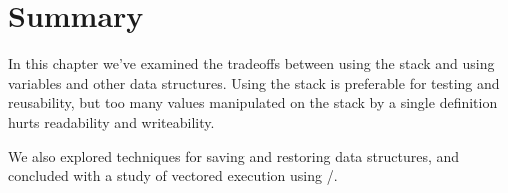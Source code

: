 \section{Summary}
In this chapter we've examined the tradeoffs between using the stack and
using variables and other data structures. Using the stack is preferable
for testing and reusability, but too many values manipulated on the stack
by a single definition hurts readability and writeability.

We also explored techniques for saving and restoring data structures,
and concluded with a study of vectored execution using
/.%

